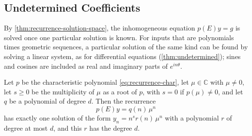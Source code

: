 \subsection{Undetermined Coefficients}

By \cref{thm:recurrence-solution-space}, the inhomogeneous equation $p(E)y=g$ is solved once one particular solution is known. For inputs that are polynomials times geometric sequences, a particular solution of the same kind can be found by solving a linear system, as for differential equations (\cref{thm:undetermined}); sines and cosines are included as real and imaginary parts of $e^{in\theta}$.

\begin{theorem}
\label{thm:discrete-undetermined}
Let $p$ be the characteristic polynomial \eqref{eq:recurrence-char}, let $\mu\in\mathbb C$ with $\mu\ne0$, let $s\ge0$ be the multiplicity of $\mu$ as a root of $p$, with $s=0$ if $p(\mu)\ne0$, and let $q$ be a polynomial of degree $d$. Then the recurrence
\[
p(E)y=q(n)\,\mu^n
\]
has exactly one solution of the form $y_n=n^sr(n)\,\mu^n$ with a polynomial $r$ of degree at most $d$, and this $r$ has the degree $d$.
\end{theorem}

